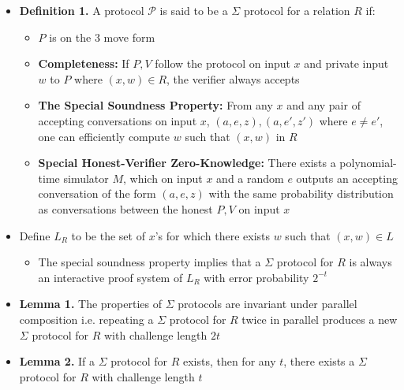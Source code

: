 \begin{itemize}
  \item \textbf{Definition 1.} A protocol $\mathcal P$ is said to be a $\Sigma$ protocol for a relation $R$ if:
  \begin{itemize}
    \item $P$ is on the 3 move form
    \item \textbf{Completeness:} If $P,V$ follow the protocol on input $x$ and private input $w$ to $P$ where $(x,w) \in R$, the verifier always accepts
  	\item \textbf{The Special Soundness Property:} From any $x$ and any pair of accepting conversations on input $x$, $(a,e,z),(a,e',z')$ where $e \neq e'$, one can efficiently compute $w$ such that $(x,w)$ in $R$
  	\item \textbf{Special Honest-Verifier Zero-Knowledge:} There exists a polynomial-time simulator $M$, which on input $x$ and a random $e$ outputs an accepting conversation of the form $(a,e,z)$ with the same probability distribution as conversations between the honest $P,V$ on input $x$
  \end{itemize}
  \item Define $L_R$ to be the set of $x$'s for which there exists $w$ such that $(x,w) \in L$
  \begin{itemize}
  	\item The special soundness property implies that a $\Sigma$ protocol for $R$ is always an interactive proof system of $L_R$ with error probability $2^{-t}$
  \end{itemize}
  \item \textbf{Lemma 1.} The properties of $\Sigma$ protocols are invariant under parallel composition i.e. repeating a $\Sigma$ protocol for $R$ twice in parallel produces a new $\Sigma$ protocol for $R$ with challenge length $2t$

  \item \textbf{Lemma 2.} If a $\Sigma$ protocol for $R$ exists, then for any $t$, there exists a $\Sigma$ protocol for $R$ with challenge length $t$ 

\end{itemize}

